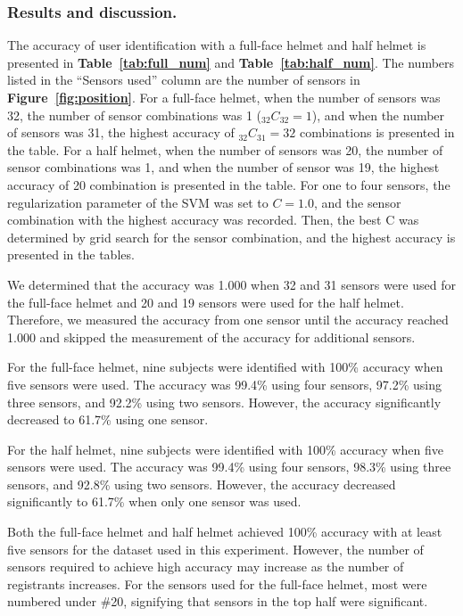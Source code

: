 \documentclass[sigconf,authordraft]{acmart}
\newcommand\figref[1]{\textbf{Figure~\ref{fig:#1}}}
\newcommand\tabref[1]{\textbf{Table~\ref{tab:#1}}}
\begin{document}
\subsubsection{Results and discussion.}
The accuracy of user identification with a full-face helmet and half helmet is presented in \tabref{full_num} and \tabref{half_num}. The numbers listed in the ``Sensors used'' column are the number of sensors in \figref{position}. For a full-face helmet, when the number of sensors was 32, the number of sensor combinations was 1 ($_{32}C_{32}=1$), and when the number of sensors was 31, the highest accuracy of $_{32}C_{31}=32$ combinations is presented in the table. For a half helmet, when the number of sensors was 20, the number of sensor combinations was 1, and when the number of sensor was 19, the highest accuracy of 20 combination is presented in the table. For one to four sensors, the regularization parameter of the SVM was set to $C=1.0$, and the sensor combination with the highest accuracy was recorded. Then, the best C was determined by grid search for the sensor combination, and the highest accuracy is presented in the tables.\par

We determined that the accuracy was 1.000 when 32 and 31 sensors were used for the full-face helmet and 20 and 19 sensors were used for the half helmet. Therefore, we measured the accuracy from one sensor until the accuracy reached 1.000 and skipped the measurement of the accuracy for additional sensors.\par

For the full-face helmet, nine subjects were identified with 100\% accuracy when five sensors were used. The accuracy was 99.4\% using four sensors, 97.2\% using three sensors, and 92.2\% using two sensors. However, the accuracy significantly decreased to 61.7\% using one sensor.\par

For the half helmet, nine subjects were identified with 100\% accuracy when five sensors were used. The accuracy was 99.4\% using four sensors, 98.3\% using three sensors, and 92.8\% using two sensors. However, the accuracy decreased significantly to 61.7\% when only one sensor was used.\par

Both the full-face helmet and half helmet achieved 100\% accuracy with at least five sensors for the dataset used in this experiment. However, the number of sensors required to achieve high accuracy may increase as the number of registrants increases. For the sensors used for the full-face helmet, most were numbered under \#20, signifying that sensors in the top half were significant.
\end{document}
